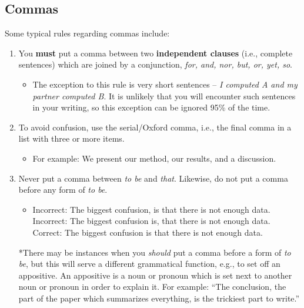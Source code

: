 \subsection{Commas}
Some typical rules regarding commas include:
\begin{enumerate}
	\item You \textbf{must} put a comma between two \textbf{independent clauses} (i.e., complete sentences) which are joined by a conjunction, \textit{for, and, nor, but, or, yet, so}.
	\begin{itemize}
		\item The exception to this rule is very short sentences -- \textit{I computed A and my partner computed B}. It is unlikely that you will encounter such sentences in your writing, so this exception can be ignored 95\% of the time.
	\end{itemize}
	\item To avoid confusion, use the serial/Oxford comma, i.e., the final comma in a list with three or more items.	
	\begin{itemize}
		\item For example: We present our method, our results, and a discussion.
	\end{itemize}
\item Never put a comma between \textit{to be} and \textit{that}. Likewise, do not put a comma before any form of \textit{to be}. 
\begin{itemize}
	\item Incorrect: The biggest confusion, is that there is not enough data. \\
	Incorrect: The biggest confusion is, that there is not enough data.\\
	Correct: The biggest confusion is that there is not enough data.
	 \end{itemize}
 *There may be instances when you \textit{should} put a comma before a form of \textit{to be}, but this will serve a different grammatical function, e.g., to set off an appositive. An appositive is a noun or pronoun which is set next to another noun or pronoun in order to explain it. For example: ``The conclusion, the part of the paper which summarizes everything, is the trickiest part to write.''

\end{enumerate}
